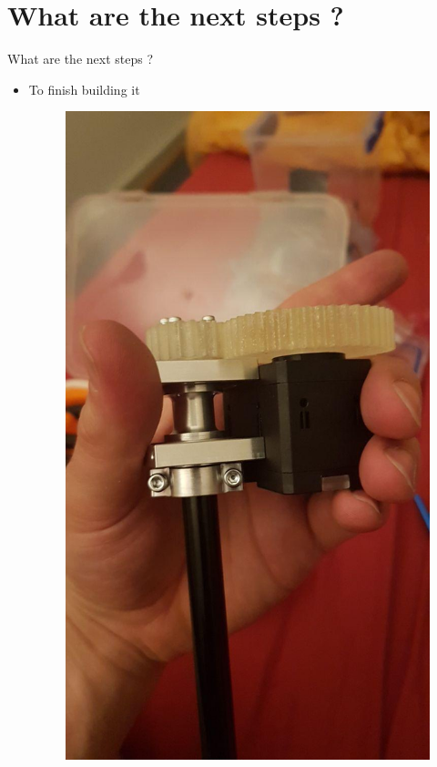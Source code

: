 \documentclass{beamer}
\begin{document}
\section{What are the next steps ?}
\begin{frame}{What are the next steps ?}
\begin{itemize}
\item To finish building it
\begin{figure}
\includegraphics[scale=0.3]{pictures/build1}

\end{figure}
\end{itemize}
\end{frame}
\end{document}
